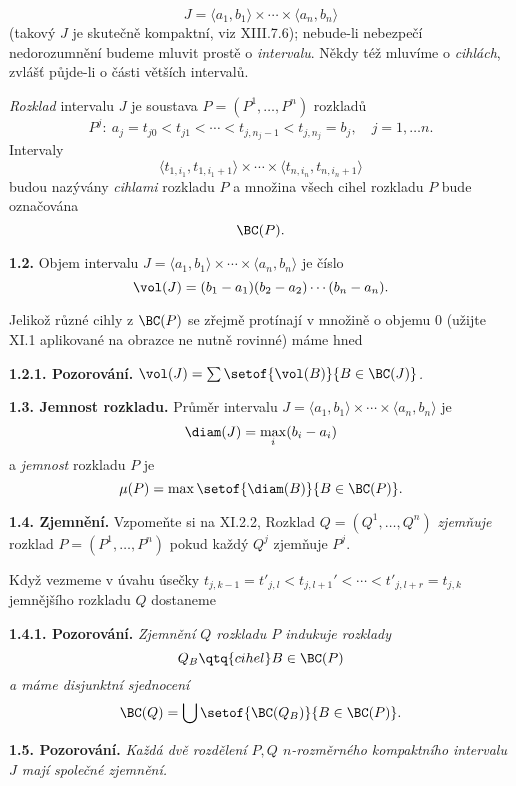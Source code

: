 \documentclass[12pt]{article}
\begin{document}
$$
J=\langle a_1,b_1\rangle\times\cdots\times\langle a_n,b_n\rangle
$$
(takový $J$ je skutečně kompaktní, viz  XIII.7.6); nebude-li nebezpečí nedorozumnění budeme mluvit prostě o
 {\em intervalu}. Někdy též mluvíme o  {\em cihlách}, zvlášť půjde-li o části větších intervalů.

\smallskip
 {\em Rozklad} intervalu $J$ je soustava $P=(P^1,\dots,P^n)$ rozkladů
$$
 P^j:\ a_j=t_{j0}< t_{j1}<\cdots<t_{j,{n_j-1}}< t_{j,{n_j}}=b_j, \quad j=1,\dots n.
 $$
Intervaly
 $$
 \langle t_{1,i_1},t_{1,{i_1+1}}\rangle\times\cdots\times\langle t_{n,i_n},t_{n,{i_n+1}}\rangle
 $$
 budou nazývány {\em cihlami} rozkladu $P$ a množina všech cihel rozkladu $P$ bude označována
 $$
 \BC(P).
  $$
 
 
 \bigskip
 
 {\bf 1.2.} Objem intervalu 
$
J=\langle a_1,b_1\rangle\times\cdots\times\langle a_n,b_n\rangle
$ 
je číslo
$$
\vol(J)=(b_1-a_1)(b_2-a_2)\cdots(b_n-a_n).
$$

\medskip

Jelikož různé cihly z $\BC(P)$ se zřejmě protínají v množině o objemu 0 (užijte XI.1 aplikované na obrazce ne nutně rovinné)
máme hned  

\smallskip

{\bf 1.2.1. Pozorování.} {\em $\vol(J)=\sum\setof{\vol(B)}{B\in\BC(J)}$.}

\bigskip

{\bf 1.3. Jemnost rozkladu.} Průměr intervalu
 $
J=\langle a_1,b_1\rangle\times\cdots\times\langle a_n,b_n\rangle
$
je
$$
\diam(J)=\max_i(b_i-a_i)
$$
a {\em jemnost} rozkladu $P$
je
$$
\mu(P)=\max\setof{\diam(B)}{B\in\BC(P)}.
$$

\bigskip


{\bf 1.4. Zjemnění.} Vzpomeňte si na XI.2.2, Rozklad $Q=(Q^1,\dots,Q^n)$ {\em zjemňuje}
rozklad $P=(P^1,\dots,P^n)$ pokud každý $Q^j$ zjemňuje $P^j$.

Když vezmeme v úvahu úsečky $t_{j,{k-1}}=t'_{j,l}< t_{j,{l+1}}'<\cdots< t'_{j,{l+r}}=t_{j,k}$ jemnějšího  rozkladu $Q$ dostaneme
 
 \medskip
 
 {\bf 1.4.1. Pozorování.} {\em Zjemnění $Q$ rozkladu $P$ indukuje rozklady
 $$
 Q_B\qtq{cihel} B\in \BC(P)
 $$
 a máme disjunktní sjednocení
 $$
 \BC(Q)=\bigcup\setof{\BC(Q_B)}{B\in\BC(P)}.
 $$}
 
 \bigskip
 
 {\bf 1.5. Pozorování.} {\em Každá dvě rozdělení $P,Q$  $n$-rozměrného kompaktního intervalu $J$ mají
 společné zjemnění.}
 
\end{document}
